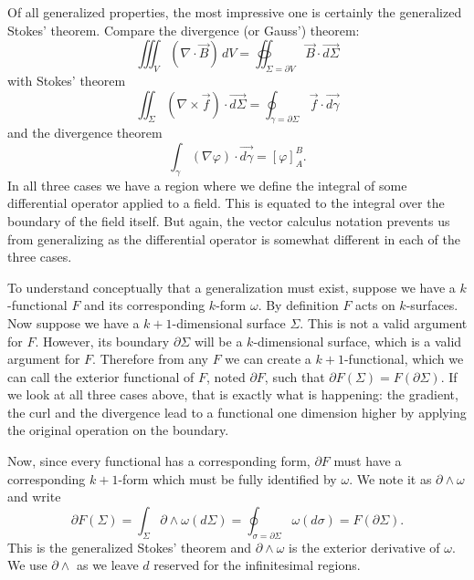 \documentclass[fleqn,10pt]{wlscirep}
\begin{document}
Of all generalized properties, the most impressive one is certainly the generalized Stokes' theorem. Compare the divergence (or Gauss') theorem:
\begin{equation*}
	\iiint_V (\nabla \cdot \vec{B}) \, dV = \oiint_{\Sigma = \partial V} \vec{B} \cdot \vec{d\Sigma}
\end{equation*}
with Stokes' theorem
\begin{equation*}
	\iint_\Sigma (\nabla \times \vec{f}) \cdot \vec{d\Sigma} = \oint_{\gamma = \partial \Sigma} \vec{f} \cdot \vec{d\gamma}
\end{equation*}
and the divergence theorem
\begin{equation*}
	\int_\gamma (\nabla \varphi) \cdot \vec{d\gamma} = \left[ \varphi \right]_A^B .
\end{equation*}
In all three cases we have a region where we define the integral of some differential operator applied to a field. This is equated to the integral over the boundary of the field itself. But again, the vector calculus notation prevents us from generalizing as the differential operator is somewhat different in each of the three cases.

To understand conceptually that a generalization must exist, suppose we have a $k$-functional $F$ and its corresponding $k$-form $\omega$. By definition $F$ acts on $k$-surfaces. Now suppose we have a $k+1$-dimensional surface $\Sigma$. This is not a valid argument for $F$. However, its boundary $\partial \Sigma$ will be a $k$-dimensional surface, which is a valid argument for $F$. Therefore from any $F$ we can create a $k+1$-functional, which we can call the exterior functional of $F$, noted $\partial F$, such that $\partial F(\Sigma) = F(\partial \Sigma)$. If we look at all three cases above, that is exactly what is happening: the gradient, the curl and the divergence lead to a functional one dimension higher by applying the original operation on the boundary.

Now, since every functional has a corresponding form, $\partial F$ must have a corresponding $k+1$-form which must be fully identified by $\omega$. We note it as $\partial \wedge \omega$ and write
\begin{equation*}
	\partial F(\Sigma) = \int_\Sigma \partial \wedge \omega(d\Sigma) = \oint_{\sigma = \partial \Sigma} \omega(d\sigma) = F(\partial \Sigma).
\end{equation*}
This is the generalized Stokes' theorem and $\partial \wedge \omega$ is the exterior derivative of $\omega$. We use $\partial \wedge$ as we leave $d$ reserved for the infinitesimal regions.
\end{document}
